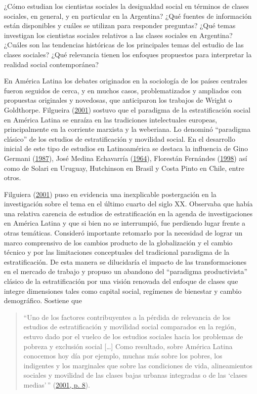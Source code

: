 \documentclass[
]{article}
\begin{document}
¿Cómo estudian los cientistas sociales la desigualdad social en términos de clases sociales, en general, y en particular en la Argentina? ¿Qué fuentes de información están disponibles y cuáles se utilizan para responder preguntas? ¿Qué temas investigan los cientistas sociales relativos a las clases sociales en Argentina? ¿Cuáles son las tendencias históricas de los principales temas del estudio de las clases sociales? ¿Qué relevancia tienen los enfoques propuestos para interpretar la realidad social contemporánea?

En América Latina los debates originados en la sociología de los países centrales fueron seguidos de cerca, y en muchos casos, problematizados y ampliados con propuestas originales y novedosas, que anticiparon los trabajos de Wright o Goldthorpe. Filgueira (\protect\hyperlink{ref-Filgueira2001}{2001}) sostuvo que el paradigma de la estratificación social en América Latina se enraíza en las tradiciones intelectuales europeas, principalmente en la corriente marxista y la weberiana. Lo denominó ``paradigma clásico'' de los estudios de estratificación y movilidad social. En el desarrollo inicial de este tipo de estudios en Latinoamérica se destaca la influencia de Gino Germani (\protect\hyperlink{ref-Germani1987}{1987}), José Medina Echavarría (\protect\hyperlink{ref-MedinaEchavarria1964}{1964}), Florestán Fernándes (\protect\hyperlink{ref-Fernandes1998}{1998}) así como de Solari en Uruguay, Hutchinson en Brasil y Costa Pinto en Chile, entre otros.

Filguiera (\protect\hyperlink{ref-Filgueira2001}{2001}) puso en evidencia una inexplicable postergación en la investigación sobre el tema en el último cuarto del siglo XX. Observaba que había una relativa carencia de estudios de estratificación en la agenda de investigaciones en América Latina y que si bien no se interrumpió, fue perdiendo lugar frente a otras temáticas. Consideró importante retomarlo por la necesidad de lograr un marco comprensivo de los cambios producto de la globalización y el cambio técnico y por las limitaciones conceptuales del tradicional paradigma de la estratificación. De esta manera se dilucidaría el impacto de las transformaciones en el mercado de trabajo y propuso un abandono del ``paradigma productivista'' clásico de la estratificación por una visión renovada del enfoque de clases que integre dimensiones tales como capital social, regímenes de bienestar y cambio demográfico. Sostiene que

\begin{quote}
``Uno de los factores contribuyentes a la pérdida de relevancia de los estudios de estratificación y movilidad social comparados en la región, estuvo dado por el vuelco de los estudios sociales hacia los problemas de pobreza y exclusión social {[}\ldots{]} Como resultado, sobre América Latina conocemos hoy día por ejemplo, muchas más sobre los pobres, los indigentes y los marginales que sobre las condiciones de vida, alineamientos sociales y movilidad de las clases bajas urbanas integradas o de las `clases medias'\,'' (\protect\hyperlink{ref-Filgueira2001}{2001, p. 8}).
\end{quote}
\end{document}
